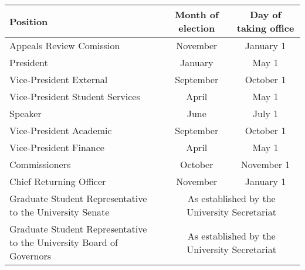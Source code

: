 
\begin{center}
    \begin{tabular}{ p{7cm} |c   c }

    Position & Month of election & Day of taking office \\  \hline
    Appeals Review Comission & November & January 1\\ 
    President & January & May 1\\
    Vice-President External & September & October 1 \\ 
    Vice-President Student Services & April & May 1 \\ 
    Speaker & June & July 1 \\ 
    Vice-President Academic & September & October 1 \\ 
    Vice-President Finance  & April & May 1 \\ 
    Commissioners & October & November  1 \\ 
    Chief Returning Officer & November & January 1 \\ 
	Graduate Student Representative to the University Senate &\multicolumn{2}{c}{As established by the University Secretariat}\\
	Graduate Student Representative to the University Board of Governors  &\multicolumn{2}{c}{As established by the University Secretariat}\\	
	
	
    
\end{tabular}
\end{center}
